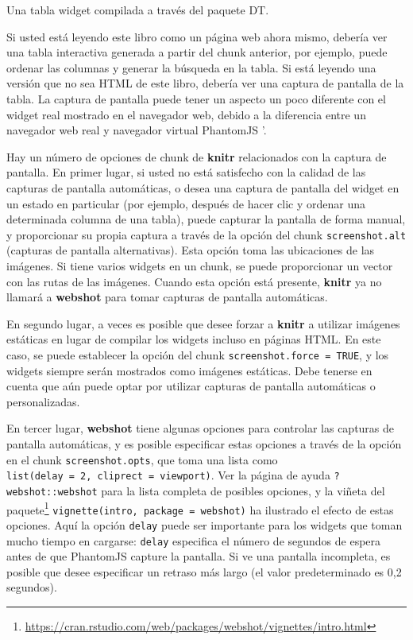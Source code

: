\documentclass[12pt,]{krantz}
\renewcommand{\href}[2]{#2\footnote{\url{#1}}}
\theoremstyle{definition}
\theoremstyle{definition}
\theoremstyle{remark}
\begin{document}
\hypertarget{htmlwidget-9d8c19d936afb1a49c18}{}

\label{fig:DT-demo}Una tabla widget compilada a través del paquete DT.

Si usted está leyendo este libro como un página web ahora mismo, debería
ver una tabla interactiva generada a partir del chunk anterior, por
ejemplo, puede ordenar las columnas y generar la búsqueda en la tabla.
Si está leyendo una versión que no sea HTML de este libro, debería ver
una captura de pantalla de la tabla. La captura de pantalla puede tener
un aspecto un poco diferente con el widget real mostrado en el navegador
web, debido a la diferencia entre un navegador web real y navegador
virtual PhantomJS '.

Hay un número de opciones de chunk de \textbf{knitr} relacionados con la
captura de pantalla. En primer lugar, si usted no está satisfecho con la
calidad de las capturas de pantalla automáticas, o desea una captura de
pantalla del widget en un estado en particular (por ejemplo, después de
hacer clic y ordenar una determinada columna de una tabla), puede
capturar la pantalla de forma manual, y proporcionar su propia captura a
través de la opción del chunk \texttt{screenshot.alt} (capturas de
pantalla alternativas). Esta opción toma las ubicaciones de las
imágenes. Si tiene varios widgets en un chunk, se puede proporcionar un
vector con las rutas de las imágenes. Cuando esta opción está presente,
\textbf{knitr} ya no llamará a \textbf{webshot} para tomar capturas de
pantalla automáticas.

En segundo lugar, a veces es posible que desee forzar a \textbf{knitr} a
utilizar imágenes estáticas en lugar de compilar los widgets incluso en
páginas HTML. En este caso, se puede establecer la opción del chunk
\texttt{screenshot.force\ =\ TRUE}, y los widgets siempre serán
mostrados como imágenes estáticas. Debe tenerse en cuenta que aún puede
optar por utilizar capturas de pantalla automáticas o personalizadas.

En tercer lugar, \textbf{webshot} tiene algunas opciones para controlar
las capturas de pantalla automáticas, y es posible especificar estas
opciones a través de la opción en el chunk \texttt{screenshot.opts}, que
toma una lista como
\texttt{list(delay\ =\ 2,\ cliprect\ =\ \textquotesingle{}viewport\textquotesingle{})}.
Ver la página de ayuda \texttt{?} \texttt{webshot::webshot} para la
lista completa de posibles opciones, y la
\href{https://cran.rstudio.com/web/packages/webshot/vignettes/intro.html}{viñeta
del paquete}
\texttt{vignette(\textquotesingle{}intro\textquotesingle{},\ package\ =\ \textquotesingle{}webshot\textquotesingle{})}
ha ilustrado el efecto de estas opciones. Aquí la opción \texttt{delay}
puede ser importante para los widgets que toman mucho tiempo en
cargarse: \texttt{delay} especifica el número de segundos de espera
antes de que PhantomJS capture la pantalla. Si ve una pantalla
incompleta, es posible que desee especificar un retraso más largo (el
valor predeterminado es 0,2 segundos).
\end{document}
